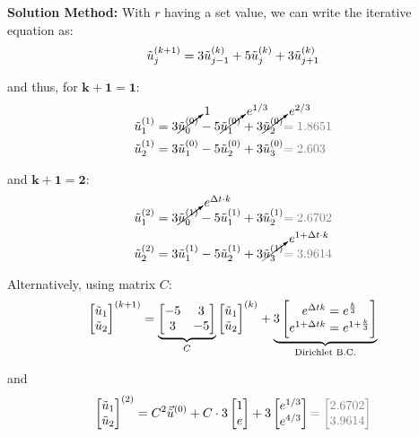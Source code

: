 \textbf{Solution Method:} With $r$ having a set value, we can write the iterative equation as:
\begin{align*}
	\tilde{u}_{j}^{(k+1)} = 3\tilde{u}_{j-1}^{(k)} + 5\tilde{u}_{j}^{(k)} + 3\tilde{u}_{j+1}^{(k)}
\end{align*}

and thus, for $\mathbf{k+1=1}$:
\begin{align*}
	\utild_1^{(1)} & = 3\cancelto{1}{\utild_0^{(0)}} - 5\cancelto{e^{1/3}}{\utild_1^{(0)}} + 3\cancelto{e^{2/3}}{\utild_2^{(0)}} {\color{gray} = 1.8651} \\
	\utild_2^{(1)} & = 3\utild_1^{(0)} - 5\utild_2^{(0)} + 3\utild_3^{(0)} {\color{gray} = 2.603}
\end{align*}

and $\mathbf{k+1 = 2}$:
\begin{align*}
	\utild_1^{(2)} & = 3\cancelto{e^{\Delta t\cdot k}}{\utild_0^{(1)}} - 5\utild_1^{(1)} + 3\utild_2^{(1)} {\color{gray} = 2.6702} \\
	\utild_2^{(2)} & = 3\utild_1^{(1)} - 5\utild_2^{(1)} + 3\cancelto{e^{1+\Delta t\cdot k}}{\utild_3^{(1)}} {\color{gray} = 3.9614}
\end{align*}

Alternatively, using matrix $C$:
\begin{align*}
	\begin{bmatrix}
		\tilde{u}_1 \\
		\tilde{u}_2
	\end{bmatrix}^{(k+1)}
	=
	\underbrace{
		\begin{bmatrix}
			-5 & 3 \\
			3 & -5
		\end{bmatrix}
	}_{C}
	\begin{bmatrix}
		\tilde{u}_1 \\
		\tilde{u}_2
	\end{bmatrix}^{(k)}
	+
	\underbrace{
		3\begin{bmatrix}
			e^{\Delta t k} = e^\frac{k}{3} \\
			e^{1+\Delta t k} = e^{1+\frac{k}{3}}
		\end{bmatrix}
	}_\text{Dirichlet B.C.}
\end{align*}

and
\begin{align*}
	\begin{bmatrix}
		\utild_1 \\
		\utild_2
	\end{bmatrix}^{(2)}
	=
	C^2\vec{\utild}^{(0)} + C\cdot 3\begin{bmatrix}
		1 \\
		e
	\end{bmatrix}
	+
	3\begin{bmatrix}
		e^{1/3} \\
		e^{4/3}
	\end{bmatrix}
	{\color{gray}
		=
		\begin{bmatrix}
			2.6702 \\
			3.9614
		\end{bmatrix}
	}
\end{align*}
